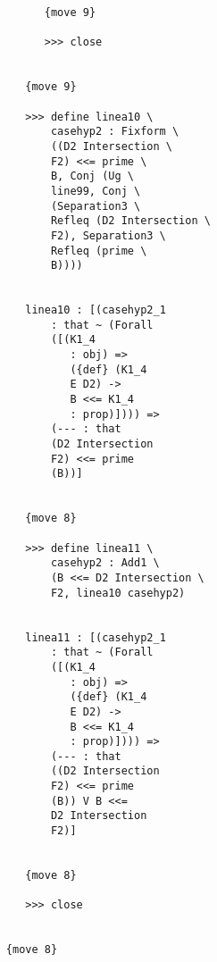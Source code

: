 \documentclass[12pt]{article}
\begin{document}
\begin{verbatim}
                              {move 9}

                              >>> close


                           {move 9}

                           >>> define linea10 \
                               casehyp2 : Fixform \
                               ((D2 Intersection \
                               F2) <<= prime \
                               B, Conj (Ug \
                               line99, Conj \
                               (Separation3 \
                               Refleq (D2 Intersection \
                               F2), Separation3 \
                               Refleq (prime \
                               B))))


                           linea10 : [(casehyp2_1 
                               : that ~ (Forall 
                               ([(K1_4 
                                  : obj) => 
                                  ({def} (K1_4 
                                  E D2) -> 
                                  B <<= K1_4 
                                  : prop)]))) => 
                               (--- : that 
                               (D2 Intersection 
                               F2) <<= prime 
                               (B))]


                           {move 8}

                           >>> define linea11 \
                               casehyp2 : Add1 \
                               (B <<= D2 Intersection \
                               F2, linea10 casehyp2)


                           linea11 : [(casehyp2_1 
                               : that ~ (Forall 
                               ([(K1_4 
                                  : obj) => 
                                  ({def} (K1_4 
                                  E D2) -> 
                                  B <<= K1_4 
                                  : prop)]))) => 
                               (--- : that 
                               ((D2 Intersection 
                               F2) <<= prime 
                               (B)) V B <<= 
                               D2 Intersection 
                               F2)]


                           {move 8}

                           >>> close


                        {move 8}


\end{verbatim}
\end{document}
